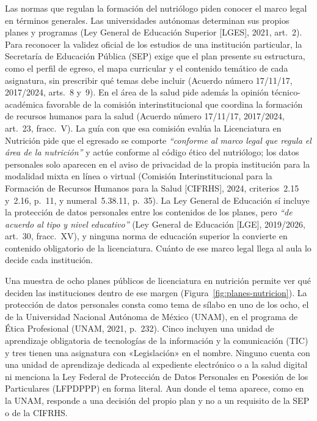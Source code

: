 \documentclass[12pt, a4paper]{article}
\begin{document}
Las normas que regulan la formación del nutriólogo piden conocer el
marco legal en términos generales. Las universidades autónomas
determinan sus propios planes y programas (Ley General de Educación
Superior [LGES], 2021, art.~2). Para reconocer la validez oficial de
los estudios de una institución particular, la Secretaría de Educación
Pública (SEP) exige que el plan presente su estructura, como el perfil de
egreso, el mapa curricular y el contenido temático de cada asignatura,
sin prescribir qué temas debe incluir (Acuerdo número 17/11/17,
2017/2024, arts.~8 y~9). En el área de la salud pide además la opinión
técnico-académica favorable de la comisión interinstitucional que
coordina la formación de recursos humanos para la salud (Acuerdo número
17/11/17, 2017/2024, art.~23, fracc.~V). La guía con que esa comisión
evalúa la Licenciatura en Nutrición pide que el egresado se comporte
\textit{``conforme al marco legal que regula el área de la nutrición''} y actúe
conforme al código ético del nutriólogo; los datos personales solo
aparecen en el aviso de privacidad de la propia institución para la
modalidad mixta en línea o virtual (Comisión Interinstitucional para la Formación de
Recursos Humanos para la Salud [CIFRHS], 2024, criterios~2.15 y~2.16,
p.~11, y numeral~5.38.11, p.~35). La Ley General de Educación sí
incluye la protección de datos personales entre los contenidos de los
planes, pero \textit{``de acuerdo al tipo y nivel educativo''} (Ley General de
Educación [LGE], 2019/2026, art.~30, fracc.~XV), y ninguna norma de
educación superior la convierte en contenido obligatorio de la
licenciatura. Cuánto de ese marco legal llega al aula lo decide cada
institución.
 
Una muestra de ocho planes públicos de licenciatura en nutrición permite
ver qué deciden las instituciones dentro de ese margen
(Figura~\ref{fig:planes-nutricion}). La protección de datos personales
consta como tema de sílabo en uno de los ocho, el de la Universidad
Nacional Autónoma de México (UNAM), en el programa de Ética Profesional
(UNAM, 2021, p.~232). Cinco incluyen una unidad de aprendizaje
obligatoria de tecnologías de la información y la comunicación (TIC) y
tres tienen una asignatura con «Legislación» en el nombre. Ninguno
cuenta con una unidad de aprendizaje dedicada al expediente electrónico
o a la salud digital ni menciona la Ley Federal de Protección de Datos
Personales en Posesión de los Particulares (LFPDPPP) en forma literal.
Aun donde el tema aparece, como en la UNAM, responde a una decisión del
propio plan y no a un requisito de la SEP o de la CIFRHS.
 
\end{document}
